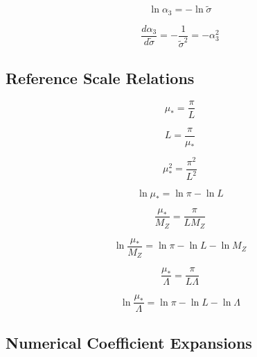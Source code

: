 \documentclass[11pt,a4paper]{article}
\theoremstyle{definition}
\begin{document}
\begin{equation}
\label{eq:add-39}
\ln\alpha_3 = -\ln\tilde{\sigma}
\end{equation}

\begin{equation}
\label{eq:add-40}
\frac{d\alpha_3}{d\tilde{\sigma}} = -\frac{1}{\tilde{\sigma}^2} = -\alpha_3^2
\end{equation}

\subsection{Reference Scale Relations}
\label{subsec:add-ref}

\begin{equation}
\label{eq:add-41}
\mu_* = \frac{\pi}{L}
\end{equation}

\begin{equation}
\label{eq:add-42}
L = \frac{\pi}{\mu_*}
\end{equation}

\begin{equation}
\label{eq:add-43}
\mu_*^2 = \frac{\pi^2}{L^2}
\end{equation}

\begin{equation}
\label{eq:add-44}
\ln\mu_* = \ln\pi - \ln L
\end{equation}

\begin{equation}
\label{eq:add-45}
\frac{\mu_*}{M_Z} = \frac{\pi}{L M_Z}
\end{equation}

\begin{equation}
\label{eq:add-46}
\ln\frac{\mu_*}{M_Z} = \ln\pi - \ln L - \ln M_Z
\end{equation}

\begin{equation}
\label{eq:add-47}
\frac{\mu_*}{\Lambda} = \frac{\pi}{L\Lambda}
\end{equation}

\begin{equation}
\label{eq:add-48}
\ln\frac{\mu_*}{\Lambda} = \ln\pi - \ln L - \ln\Lambda
\end{equation}

\subsection{Numerical Coefficient Expansions}
\label{subsec:add-numerical}
\end{document}
